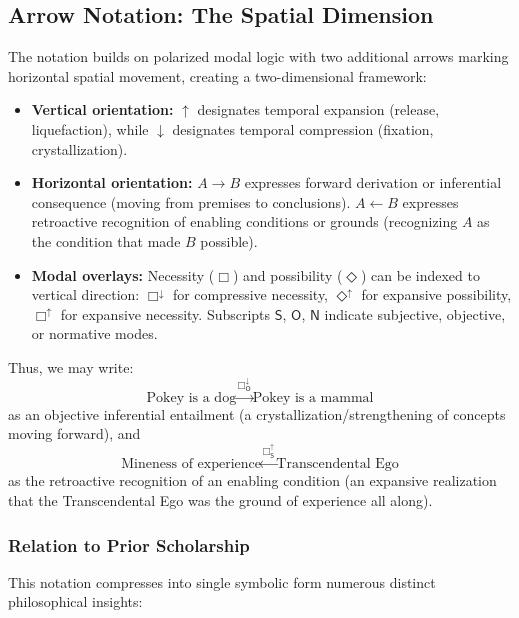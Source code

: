 \documentclass[12pt]{book}
\newcommand{\SBoxUp}{\Box_{\mathsf{S}}^{\uparrow}}
\newcommand{\OBoxDown}{\Box_{\mathsf{O}}^{\downarrow}}
\begin{document}
\subsection{Arrow Notation: The Spatial Dimension}

The notation builds on polarized modal logic with two additional arrows marking horizontal spatial movement, creating a two-dimensional framework:

\begin{itemize}
  \item \textbf{Vertical orientation:} $\uparrow$ designates temporal expansion (release, liquefaction), while $\downarrow$ designates temporal compression (fixation, crystallization).
  
  \item \textbf{Horizontal orientation:} $A \rightarrow B$ expresses forward derivation or inferential consequence (moving from premises to conclusions). $A \leftarrow B$ expresses retroactive recognition of enabling conditions or grounds (recognizing $A$ as the condition that made $B$ possible).
  
  \item \textbf{Modal overlays:} Necessity ($\Box$) and possibility ($\Diamond$) can be indexed to vertical direction: $\Box^{\downarrow}$ for compressive necessity, $\Diamond^{\uparrow}$ for expansive possibility, $\Box^{\uparrow}$ for expansive necessity. Subscripts $\mathsf{S}$, $\mathsf{O}$, $\mathsf{N}$ indicate subjective, objective, or normative modes.
\end{itemize}

Thus, we may write:
\[
\text{Pokey is a dog} \xrightarrow{\,\OBoxDown\,} \text{Pokey is a mammal}
\]
as an objective inferential entailment (a crystallization/strengthening of concepts moving forward), and
\[
\text{Mineness of experience} \xleftarrow{\,\SBoxUp\,} \text{Transcendental Ego}
\]
as the retroactive recognition of an enabling condition (an expansive realization that the Transcendental Ego was the ground of experience all along).

\subsubsection{Relation to Prior Scholarship}

This notation compresses into single symbolic form numerous distinct philosophical insights:
\end{document}
